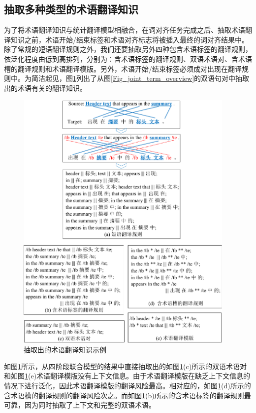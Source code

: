 \subsection{抽取多种类型的术语翻译知识}

为了将术语翻译知识与统计翻译模型相融合，在词对齐任务完成之后、抽取术语翻译知识之前，术语开始/结束标签和术语对齐标志将被插入最终的词对齐结果中。除了常规的短语翻译规则之外，我们还要抽取另外四种包含术语标签的翻译规则，依泛化程度由低到高排列，分别为：含术语标签的翻译规则、双语术语对、含术语槽的翻译规则和术语翻译模版。另外，术语开始/结束标签必须成对出现在翻译规则中。为简洁起见，图\ref{Fig_term_knowledge_sample}列出了从图\ref{Fig_joint_term_overview}的双语句对中抽取出的术语有关的翻译知识。

\begin{figure}[!bt]
	\centering
	\includegraphics[width=0.95\textwidth]{Figure/Figure_4_6.pdf}
	\caption{抽取出的术语翻译知识示例}
	\label{Fig_term_knowledge_sample}
\end{figure}

如图\ref{Fig_term_knowledge_sample}所示，从四阶段联合模型的结果中直接抽取出的如图\ref{Fig_term_knowledge_sample}(c)所示的双语术语对和如图\ref{Fig_term_knowledge_sample}(e)术语翻译模版没有上下文信息。由于术语翻译模版在缺乏上下文信息的情况下进行泛化，因此术语翻译模版的翻译风险最高。相对应的，如图\ref{Fig_term_knowledge_sample}(d)所示的含术语槽的翻译规则的翻译风险次之。而如图\ref{Fig_term_knowledge_sample}(b)所示的含术语标签的翻译规则最可靠，因为同时抽取了上下文和完整的双语术语。

